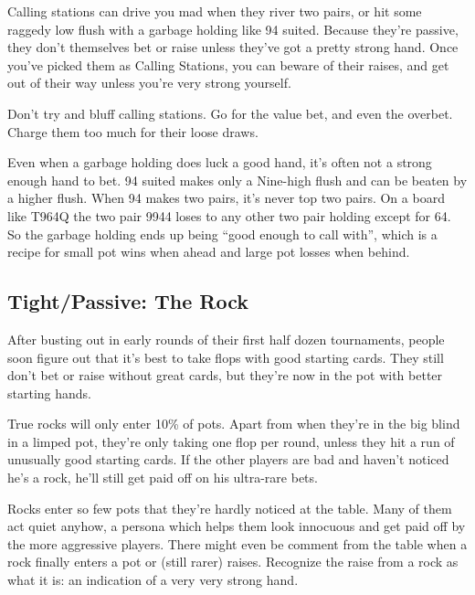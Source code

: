 Calling stations can drive you mad when they river two pairs,
or hit some raggedy low flush with a garbage holding like 94 suited.
Because they're passive, they don't themselves bet or raise unless
they've got a pretty strong hand. Once you've picked them as
Calling Stations, you can beware of their raises, and get out of
their way unless you're very strong yourself.

Don't try and bluff calling stations. Go for the value bet,
and even the overbet. Charge them too much for their loose draws.

Even when a garbage holding does luck a good hand, it's often
not a strong enough hand to bet. 94 suited makes only a Nine-high
flush and can be beaten by a higher flush. When 94 makes two pairs,
it's never top two pairs. On a board like T964Q the two pair 9944
loses to any other two pair holding except for 64. So the garbage
holding ends up being ``good enough to call with'', which is a
recipe for small pot wins when ahead and large pot losses when
behind.

\subsection{Tight/Passive: The Rock}

After busting out in early rounds of their first half dozen
tournaments, people soon figure out that it's best to take flops
with good starting cards. They still don't bet or raise without
great cards, but they're now in the pot with better starting hands.

True rocks will only enter 10\% of pots. Apart from when they're
in the big blind in a limped pot, they're only taking one
flop per round, unless they hit a run of unusually good starting
cards. If the other players are bad and haven't noticed
he's a rock, he'll still get paid off on his ultra-rare bets.


Rocks enter so few pots that they're hardly noticed
at the table. Many of them act quiet anyhow,
a persona which helps them look innocuous and get paid off by the
more aggressive players. There might even be comment from the table
when a rock finally enters a pot or (still rarer) raises. Recognize
the raise from a rock as what it is: an indication of a very very
strong hand.

